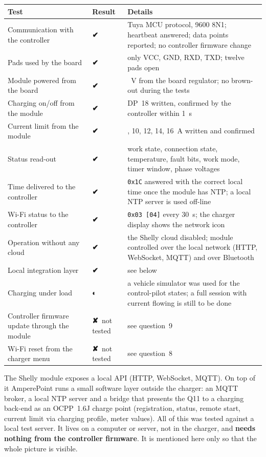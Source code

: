 \documentclass[11pt,a4paper]{article}
\newcommand{\ok}{{\symbolfont\color{apgreen}\textbf{✔}}}
\newcommand{\half}{{\symbolfont\color{apwarn}\textbf{◐}}}
\newcommand{\no}{{\symbolfont\color{apred}\textbf{✘}}}
\newcommand{\hx}[1]{\texttt{#1}}
\begin{document}
\begin{longtable}{>{\raggedright\arraybackslash}p{4.2cm}>{\raggedright\arraybackslash}p{1.7cm}>{\raggedright\arraybackslash}p{10.1cm}}
\toprule
\rowcolor{aphead}\textbf{Test} & \textbf{Result} & \textbf{Details} \\
\midrule\endhead
\bottomrule\endfoot
Communication with the controller & \ok & Tuya MCU protocol, 9600 8N1; heartbeat answered; data points reported; no controller firmware change \\
Pads used by the board & \ok & only VCC, GND, RXD, TXD; twelve pads open \\
Module powered from the board & \ok & 3.3~V from the board regulator; no brown-out during the tests \\
Charging on/off from the module & \ok & DP~18 written, confirmed by the controller within 1~s \\
Current limit from the module & \ok & 8, 10, 12, 14, 16~A written and confirmed \\
Status read-out & \ok & work state, connection state, temperature, fault bits, work mode, timer window, phase voltages \\
Time delivered to the controller & \ok & \hx{0x1C} answered with the correct local time once the module has NTP; a local NTP server is used off-line \\
Wi-Fi status to the controller & \ok & \hx{0x03 [04]} every 30~s; the charger display shows the network icon \\
Operation without any cloud & \ok & the Shelly cloud disabled; module controlled over the local network (HTTP, WebSocket, MQTT) and over Bluetooth \\
Local integration layer & \ok & see below \\
Charging under load & \half & a vehicle simulator was used for the control-pilot states; a full session with current flowing is still to be done \\
Controller firmware update through the module & \no\ not tested & see question~9 \\
Wi-Fi reset from the charger menu & \no\ not tested & see question~8 \\
\end{longtable}

\begin{apbox}
The Shelly module exposes a local API (HTTP, WebSocket, MQTT). On top of it AmperePoint runs a small software layer outside the charger: an MQTT broker, a local NTP server and a bridge that presents the Q11 to a charging back-end as an OCPP~1.6J charge point (registration, status, remote start, current limit via charging profile, meter values). All of this was tested against a local test server. It lives on a computer or server, not in the charger, and \textbf{needs nothing from the controller firmware}. It is mentioned here only so that the whole picture is visible.
\end{apbox}
\end{document}
